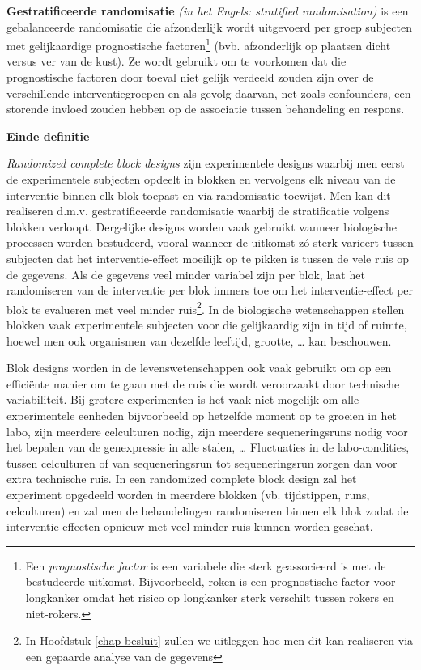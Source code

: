 \documentclass[
  12pt,dutch]{book}
\theoremstyle{definition}
\theoremstyle{definition}
\theoremstyle{definition}
\theoremstyle{definition}
\theoremstyle{remark}
\begin{document}
\textbf{Gestratificeerde randomisatie} \emph{(in het Engels: stratified
randomisation)} is een gebalanceerde randomisatie die afzonderlijk wordt
uitgevoerd per groep subjecten met gelijkaardige prognostische factoren\footnote{Een \emph{prognostische factor} is een variabele die sterk geassocieerd is met de
  bestudeerde uitkomst. Bijvoorbeeld, roken is een prognostische factor voor
  longkanker omdat het risico op longkanker sterk verschilt tussen rokers en
  niet-rokers.}
(bvb. afzonderlijk op plaatsen dicht versus ver van de kust). Ze wordt gebruikt
om te voorkomen dat die prognostische factoren door toeval niet gelijk
verdeeld zouden zijn over de verschillende interventiegroepen en als gevolg
daarvan, net zoals confounders, een storende invloed zouden hebben op de
associatie tussen behandeling en respons.

\textbf{Einde definitie}

\emph{Randomized complete block designs} zijn experimentele designs waarbij men eerst de experimentele subjecten opdeelt in blokken en vervolgens elk niveau van de interventie binnen elk blok toepast en via randomisatie toewijst. Men kan dit realiseren d.m.v. gestratificeerde randomisatie waarbij de stratificatie volgens blokken verloopt. Dergelijke designs worden vaak gebruikt wanneer biologische processen worden bestudeerd, vooral wanneer de uitkomst zó sterk varieert tussen subjecten dat het interventie-effect moeilijk op te pikken is tussen de vele ruis op de gegevens. Als de gegevens veel minder variabel zijn per blok, laat het randomiseren van de interventie per blok immers toe om het interventie-effect per blok te evalueren met veel minder ruis\footnote{In Hoofdstuk \ref{chap-besluit} zullen we uitleggen hoe men dit kan realiseren via een gepaarde analyse van de gegevens}. In de biologische wetenschappen stellen blokken vaak experimentele subjecten voor die gelijkaardig zijn in tijd of ruimte, hoewel men ook organismen van dezelfde leeftijd, grootte, \ldots{} kan beschouwen.

Blok designs worden in de levenswetenschappen ook vaak gebruikt om op een efficiënte manier om te gaan met de ruis die wordt veroorzaakt door technische variabiliteit. Bij grotere experimenten is het vaak niet mogelijk om alle experimentele eenheden bijvoorbeeld op hetzelfde moment op te groeien in het labo, zijn meerdere celculturen nodig, zijn meerdere sequeneringsruns nodig voor het bepalen van de genexpressie in alle stalen, \ldots{} Fluctuaties in de labo-condities, tussen celculturen of van sequeneringsrun tot sequeneringsrun zorgen dan voor extra technische ruis. In een randomized complete block design zal het experiment opgedeeld worden in meerdere blokken (vb. tijdstippen, runs, celculturen) en zal men de behandelingen randomiseren binnen elk blok zodat de interventie-effecten opnieuw met veel minder ruis kunnen worden geschat.
\end{document}
